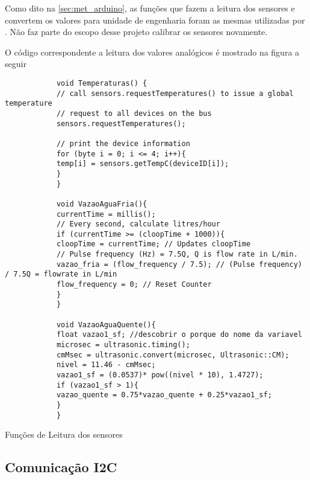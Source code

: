 		Como dito na \autoref{sec:met_arduino}, as funções que fazem a leitura dos sensores e convertem os valores para unidade de engenharia foram as mesmas utilizadas por \textcite{luiz2016}. Não faz parte do escopo desse projeto calibrar os sensores novamente.
		
		O código correspondente a leitura dos valores analógicos é mostrado na figura a seguir 
		
		
		\begin{listing}
				\begin{verbatim}
			void Temperaturas() {
			// call sensors.requestTemperatures() to issue a global temperature 
			// request to all devices on the bus
			sensors.requestTemperatures();
			
			// print the device information
			for (byte i = 0; i <= 4; i++){
			temp[i] = sensors.getTempC(deviceID[i]);
			}
			}
			
			void VazaoAguaFria(){
			currentTime = millis();
			// Every second, calculate litres/hour
			if (currentTime >= (cloopTime + 1000)){
			cloopTime = currentTime; // Updates cloopTime
			// Pulse frequency (Hz) = 7.5Q, Q is flow rate in L/min.
			vazao_fria = (flow_frequency / 7.5); // (Pulse frequency) / 7.5Q = flowrate in L/min
			flow_frequency = 0; // Reset Counter
			}
			}
			
			void VazaoAguaQuente(){
			float vazao1_sf; //descobrir o porque do nome da variavel
			microsec = ultrasonic.timing();
			cmMsec = ultrasonic.convert(microsec, Ultrasonic::CM);
			nivel = 11.46 - cmMsec;
			vazao1_sf = (0.0537)* pow((nivel * 10), 1.4727);
			if (vazao1_sf > 1){
			vazao_quente = 0.75*vazao_quente + 0.25*vazao1_sf;
			}
			}	
			\end{verbatim}
			\caption{Funções de Leitura dos sensores}
		\end{listing}
	
		\subsection{Comunicação I2C}
	
		